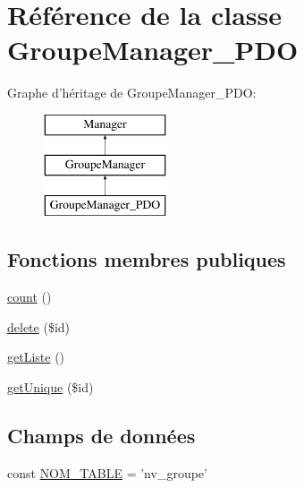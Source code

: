 \hypertarget{class_library_1_1_models_1_1_groupe_manager___p_d_o}{\section{Référence de la classe Groupe\+Manager\+\_\+\+P\+D\+O}
\label{class_library_1_1_models_1_1_groupe_manager___p_d_o}
}
Graphe d'héritage de Groupe\+Manager\+\_\+\+P\+D\+O\+:\begin{figure}[H]
\begin{center}
\leavevmode
\includegraphics[height=3.000000cm]{class_library_1_1_models_1_1_groupe_manager___p_d_o}
\end{center}
\end{figure}
\subsection*{Fonctions membres publiques}
\begin{DoxyCompactItemize}
\item 
\hyperlink{class_library_1_1_models_1_1_groupe_manager___p_d_o_ac751e87b3d4c4bf2feb03bee8b092755}{count} ()
\item 
\hyperlink{class_library_1_1_models_1_1_groupe_manager___p_d_o_a2f8258add505482d7f00ea26493a5723}{delete} (\$id)
\item 
\hyperlink{class_library_1_1_models_1_1_groupe_manager___p_d_o_a20b3a2f576f3ea746f769779a329491e}{get\+Liste} ()
\item 
\hyperlink{class_library_1_1_models_1_1_groupe_manager___p_d_o_ab94c8b937a2aa55fce0bb7f77f68c00e}{get\+Unique} (\$id)
\end{DoxyCompactItemize}
\subsection*{Champs de données}
\begin{DoxyCompactItemize}
\item 
const \hyperlink{class_library_1_1_models_1_1_groupe_manager___p_d_o_a243755033f10b0817aa9d990cc252817}{N\+O\+M\+\_\+\+T\+A\+B\+L\+E} = 'nv\+\_\+groupe'
\end{DoxyCompactItemize}
